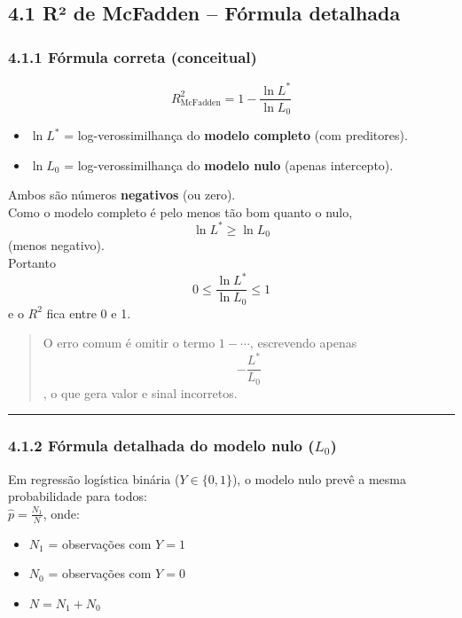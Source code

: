 \documentclass[
  letterpaper,
  DIV=11,
  numbers=noendperiod]{scrartcl}
\providecommand{\tightlist}{%
  \setlength{\itemsep}{0pt}\setlength{\parskip}{0pt}}
\begin{document}
\subsection{4.1 R² de McFadden -- Fórmula
detalhada}\label{ruxb2-de-mcfadden-fuxf3rmula-detalhada}

\subsubsection{4.1.1 Fórmula correta
(conceitual)}\label{fuxf3rmula-correta-conceitual}

\[
R^2_{\text{McFadden}} = 1 - \frac{\ln L^*}{\ln L_0}
\]

\begin{itemize}
\tightlist
\item
  \(\ln L^*\) = log-verossimilhança do \textbf{modelo completo} (com
  preditores).\\
\item
  \(\ln L_0\) = log-verossimilhança do \textbf{modelo nulo} (apenas
  intercepto).
\end{itemize}

Ambos são números \textbf{negativos} (ou zero).\\
Como o modelo completo é pelo menos tão bom quanto o nulo,
\[\ln L^* \ge \ln L_0\] (menos negativo).\\
Portanto \[
0 \le \frac{\ln L^*}{\ln L_0} \le 1
\] e o \(R^2\) fica entre 0 e 1.

\begin{quote}
O erro comum é omitir o termo \(1 - \cdots\), escrevendo apenas
\[-\frac{L^*}{L_0}\], o que gera valor e sinal incorretos.
\end{quote}

\begin{center}\rule{0.5\linewidth}{0.5pt}\end{center}

\subsubsection{\texorpdfstring{4.1.2 Fórmula detalhada do modelo nulo
(\(L_0\))}{4.1.2 Fórmula detalhada do modelo nulo (L\_0)}}\label{fuxf3rmula-detalhada-do-modelo-nulo-l_0}

Em regressão logística binária (\(Y \in \{0,1\}\)), o modelo nulo prevê
a mesma probabilidade para todos:\\
\(\hat{p} = \frac{N_1}{N}\), onde:

\begin{itemize}
\tightlist
\item
  \(N_1\) = observações com \(Y=1\)\\
\item
  \(N_0\) = observações com \(Y=0\)\\
\item
  \(N = N_1 + N_0\)
\end{itemize}
\end{document}
